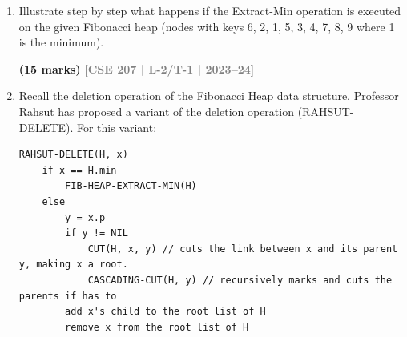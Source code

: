 \documentclass[12pt,a3paper]{article}
\newcommand{\yr}[1]{\hfill\textcolor{gray}{\small\textbf{[#1]}}}
\newcommand{\mk}[1]{\textcolor{orange!70!black}{\small\textbf{(#1 marks)}}}
\begin{document}
\begin{enumerate}
\begin{center}
\begin{tikzpicture}[
        scale=1.1,
        every node/.style={circle, draw=black, ultra thick, minimum size=0.7cm, inner sep=0pt, font=\bfseries},
        thick
    ]
    \end{tikzpicture}
\end{center}

\mk{12} \yr{CSE 207 | L-2/T-1 | 2024--25}

\item Illustrate step by step what happens if the Extract-Min operation is executed on the given Fibonacci heap (nodes with keys 6, 2, 1, 5, 3, 4, 7, 8, 9 where 1 is the minimum).

\begin{center}
\end{center}

\mk{15} \yr{CSE 207 | L-2/T-1 | 2023--24}

\item Recall the deletion operation of the Fibonacci Heap data structure. Professor Rahsut has proposed a variant of the deletion operation (RAHSUT-DELETE). For this variant:

\begin{lstlisting}
RAHSUT-DELETE(H, x)
    if x == H.min
        FIB-HEAP-EXTRACT-MIN(H)
    else
        y = x.p
        if y != NIL
            CUT(H, x, y) // cuts the link between x and its parent y, making x a root.
            CASCADING-CUT(H, y) // recursively marks and cuts the parents if has to
        add x's child to the root list of H
        remove x from the root list of H
\end{lstlisting}


\end{enumerate}
\end{document}
